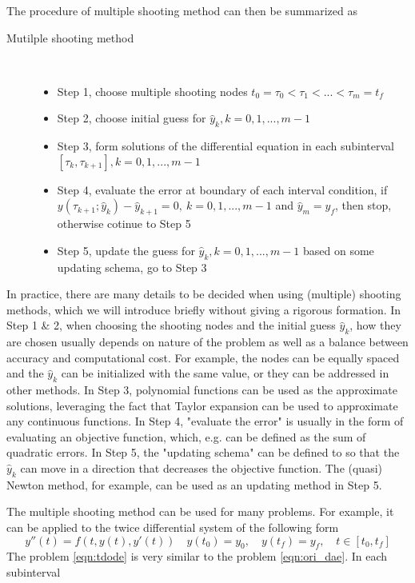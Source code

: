 The procedure of multiple shooting method can then be summarized as
\begin{description}
	\item[Mutilple shooting method] \
	\begin{itemize}
		\item Step 1, choose multiple shooting nodes $t_0 = \tau_0 < \tau_1 < ... < \tau_m = t_f$ 
		\item Step 2, choose initial guess for $\hat{y}_k, k = 0, 1, ..., m-1$ 
		\item Step 3, form solutions of the differential equation in each subinterval $[\tau_k, \tau_{k+1}], k = 0, 1, ..., m-1$
		\item Step 4, evaluate the error at boundary of each interval condition, if $y(\tau_{k+1}; \hat{y}_k) - \hat{y}_{k+1} = 0, \  k = 0, 1, ..., m-1$ and $\hat{y}_{m} = y_f$, then stop, otherwise cotinue to Step 5
		\item Step 5, update the guess for $\hat{y}_k, k = 0, 1, ..., m-1$ based on some updating schema, go to Step 3
	\end{itemize}
\end{description}

In practice, there are many details to be decided when using (multiple) shooting methods, which we will introduce briefly without giving a rigorous formation. In Step 1 \& 2, when choosing the shooting nodes and the initial guess $\hat{y}_k$, how they are chosen usually depends on nature of the problem as well as a balance between accuracy and computational cost. For example, the nodes can be equally spaced and the $\hat{y}_k$ can be initialized with the same value, or they can be addressed in other methods. In Step 3, polynomial functions can be used as the approximate solutions, leveraging the fact that Taylor expansion can be used to approximate any continuous functions. In Step 4, "evaluate the error" is usually in the form of evaluating an objective function, which, e.g. can be defined as the sum of quadratic errors. In Step 5, the "updating schema" can be defined to so that the $\hat{y}_k$ can move in a direction that decreases the objective function. The (quasi) Newton method, for example, can be used as an updating method in Step 5. 


The multiple shooting method can be used for many problems. For example, it can be applied to the twice differential system of the following form 
\begin{equation}
	 y''(t) = f(t, y(t), y'(t))  \quad y(t_0) = y_0, \quad y(t_f) = y_f,  \quad t \in [t_0, t_f]
	 \label{eqn:tdode}
\end{equation}
The problem \ref{eqn:tdode} is very similar to the problem \ref{eqn:ori_dae}. In each subinterval




